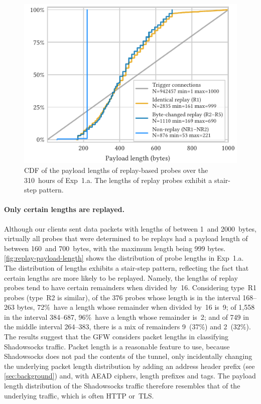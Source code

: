 \documentclass[sigconf,letterpaper]{acmart}
\begin{document}
\begin{figure}
    \includegraphics{figures/cdf_payload_length_exp1a.pdf}
    \caption{
      CDF of the payload lengths of replay-based probes over
      the 310~hours of Exp~1.a.
      The lengths of replay probes exhibit a stair-step pattern.}
    \label{fig:replay-payload-length}
\end{figure}

\paragraph{Only certain lengths are replayed.}
Although our clients sent data packets with lengths of between 1~and 2000~bytes,
virtually all probes that were determined to be replays had a payload length of between 160~and 700~bytes,
with the maximum length being 999 bytes.
\autoref{fig:replay-payload-length} shows the distribution of probe lengths in Exp~1.a.
The distribution of lengths exhibits a stair-step pattern,
reflecting the fact that certain lengths are more likely to be replayed.
Namely, the lengths of replay probes tend to have certain remainders when divided by~16.
Considering type~R1 probes (type~R2 is similar),
of the 376 probes whose length is in the interval 168--263 bytes,
72\%~have a length whose remainder when divided by~16 is~9;
of 1,558 in the interval 384--687,
96\%~have a length whose remainder is~2;
and of 749 in the middle interval 264--383,
there is a mix of remainders 9~(37\%) and 2~(32\%).
The results suggest that the GFW considers packet lengths in classifying Shadowsocks traffic.
Packet length is a reasonable feature to use,
because Shadowsocks does not pad the contents of the tunnel,
only incidentally changing the underlying packet length distribution by adding
an address header prefix (see \autoref{sec:background}) and,
with AEAD ciphers, length prefixes and tags.
The payload length distribution of the Shadowsocks traffic therefore resembles
that of the underlying traffic, which is often HTTP or~TLS.
\end{document}
